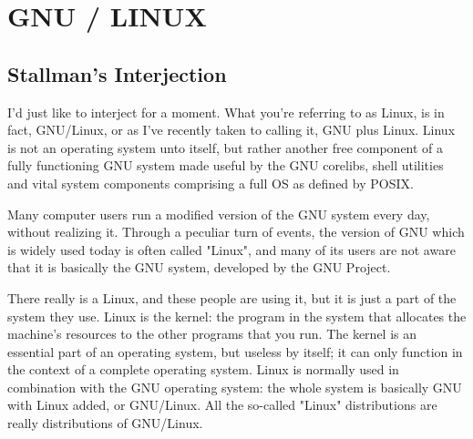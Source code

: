\chapter{GNU / LINUX}
\section{Stallman's Interjection}

I'd just like to interject for a moment.  What you're referring to as Linux,
is in fact, GNU/Linux, or as I've recently taken to calling it, GNU plus Linux.
Linux is not an operating system unto itself, but rather another free component
of a fully functioning GNU system made useful by the GNU corelibs, shell
utilities and vital system components comprising a full OS as defined by POSIX.

Many computer users run a modified version of the GNU system every day,
without realizing it.  Through a peculiar turn of events, the version of GNU
which is widely used today is often called "Linux", and many of its users are
not aware that it is basically the GNU system, developed by the GNU Project.

There really is a Linux, and these people are using it, but it is just a
part of the system they use.  Linux is the kernel: the program in the system
that allocates the machine's resources to the other programs that you run.
The kernel is an essential part of an operating system, but useless by itself;
it can only function in the context of a complete operating system.  Linux is
normally used in combination with the GNU operating system: the whole system
is basically GNU with Linux added, or GNU/Linux.  All the so-called "Linux"
distributions are really distributions of GNU/Linux.